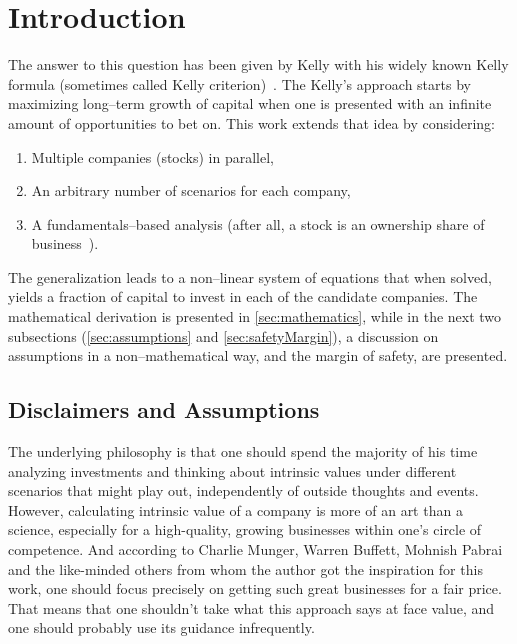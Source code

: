 \documentclass{article}
\begin{document}
\section{Introduction}
\label{sec:introduction}

The answer to this question has been given by Kelly with his widely known Kelly
formula (sometimes called Kelly criterion)~\cite{kelly}. The Kelly's approach
starts by maximizing long--term growth of capital when one is presented with
an infinite amount of opportunities to bet on. This work extends that idea by
considering:
\begin{enumerate}
    \item Multiple companies (stocks) in parallel,
    \item An arbitrary number of scenarios for each company,
    \item A fundamentals--based analysis (after all, a stock is an ownership
    share of business~\cite{intelligentInvestor}).
\end{enumerate}

The generalization leads to a non--linear system of equations that when solved,
yields a fraction of capital to invest in each of the candidate companies. The
mathematical derivation is presented in \autoref{sec:mathematics}, while in the
next two subsections (\autoref{sec:assumptions} and \autoref{sec:safetyMargin}),
a discussion on assumptions in a non--mathematical way, and the margin of
safety, are presented.

\subsection{Disclaimers and Assumptions}
\label{sec:assumptions}

The underlying philosophy is that one should spend the majority of his time
analyzing investments and thinking about intrinsic values under different
scenarios that might play out, independently of outside thoughts and events.
However, calculating intrinsic value of a company is more of an art than a
science, especially for a high-quality, growing businesses within one's circle
of competence. And according to Charlie Munger, Warren Buffett, Mohnish Pabrai
and the like-minded others from whom the author got the inspiration for this
work, one should focus precisely on getting such great businesses for a fair
price. That means that one shouldn't take what this approach says at face value,
and one should probably use its guidance infrequently.
\end{document}

